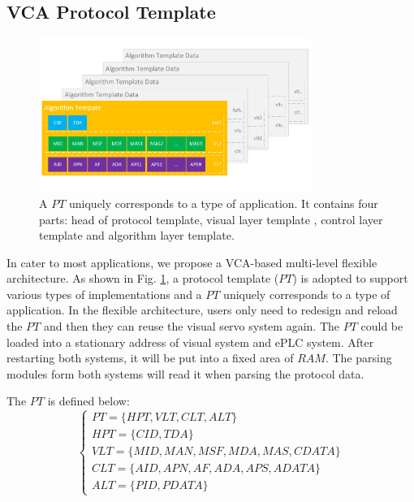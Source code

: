 \documentclass[journal,UTF8]{IEEEtran}
\begin{document}
\subsection{VCA Protocol Template}
\begin{figure}
\centering
\includegraphics[width=3.5in]{fig/PT.pdf}
\caption{A $PT$ uniquely corresponds to a type of application. It contains four parts: head of protocol template, visual layer template , control layer template and algorithm layer template.}
\label{fig:PT}
\end{figure}
In cater to most applications, we propose a VCA-based multi-level flexible architecture. As shown in Fig. \ref{fig:PT}, a protocol template ($PT$) is adopted to support various types of implementations and a $PT$ uniquely corresponds to a type of application. In the flexible architecture, users only need to redesign and reload the $PT$ and then they can reuse the visual servo system again. The $PT$ could be loaded into a stationary address of visual system and ePLC system. After restarting both systems, it will be put into a fixed area of $RAM$. The parsing modules form both systems will read it when parsing the protocol data.
 
 The $PT$ is defined below:
 \begin{equation}
 \left\{
 \begin{array}{l}
    PT = \{HPT, VLT, CLT, ALT\}\\
    HPT = \{CID, TDA\}\\
    VLT = \{MID, MAN, MSF, MDA, MAS, CDATA\}\\
    CLT = \{AID, APN, AF, ADA, APS, ADATA\}\\
    ALT = \{PID, PDATA\}
 \end{array}
 \right.
 \end{equation}
 
\end{document}
